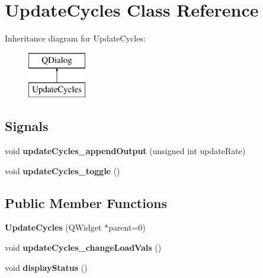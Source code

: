 \hypertarget{class_update_cycles}{}\section{Update\+Cycles Class Reference}
\label{class_update_cycles}
Inheritance diagram for Update\+Cycles\+:\begin{figure}[H]
\begin{center}
\leavevmode
\includegraphics[height=2.000000cm]{class_update_cycles}
\end{center}
\end{figure}
\subsection*{Signals}
\begin{DoxyCompactItemize}
\item 
void {\bfseries update\+Cycles\+\_\+append\+Output} (unsigned int update\+Rate)\hypertarget{class_update_cycles_a28e7dffa679d222b29f7580aae990973}{}\label{class_update_cycles_a28e7dffa679d222b29f7580aae990973}

\item 
void {\bfseries update\+Cycles\+\_\+toggle} ()\hypertarget{class_update_cycles_a77b76d06e5092225bb29b5c41bd6b602}{}\label{class_update_cycles_a77b76d06e5092225bb29b5c41bd6b602}

\end{DoxyCompactItemize}
\subsection*{Public Member Functions}
\begin{DoxyCompactItemize}
\item 
{\bfseries Update\+Cycles} (Q\+Widget $\ast$parent=0)\hypertarget{class_update_cycles_a6c24b7e92a8900fe1c2abec50cc7015d}{}\label{class_update_cycles_a6c24b7e92a8900fe1c2abec50cc7015d}

\item 
void {\bfseries update\+Cycles\+\_\+change\+Load\+Vals} ()\hypertarget{class_update_cycles_a79474646ea8f440cd4dd2ec7ff939b67}{}\label{class_update_cycles_a79474646ea8f440cd4dd2ec7ff939b67}

\item 
void {\bfseries display\+Status} ()\hypertarget{class_update_cycles_a66e1eebc1341edfc00df3103873bab63}{}\label{class_update_cycles_a66e1eebc1341edfc00df3103873bab63}

\end{DoxyCompactItemize}
